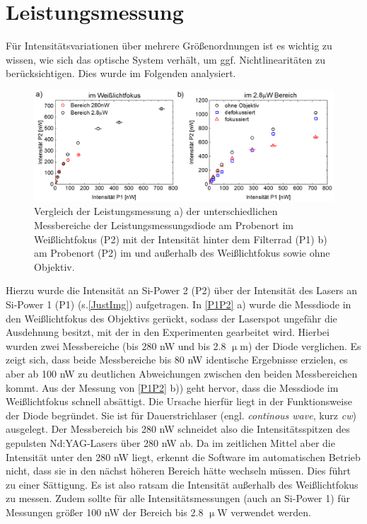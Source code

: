 \section{Leistungsmessung}
\label{Leistmess}
Für Intensitätsvariationen über mehrere Größenordnungen ist es wichtig zu wissen, wie sich das optische System verhält, um ggf. Nichtlinearitäten zu berücksichtigen. Dies wurde im Folgenden analysiert.
\begin{figure}[b]
\centering
\includegraphics[width=1\textwidth]{Bilder/Anhang/Bereichsvergleich}
\caption[Vergleich Leistungsmessung]{Vergleich der Leistungsmessung a) der unterschiedlichen Messbereiche der Leistungsmessungsdiode am Probenort im Weißlichtfokus (P2) mit der Intensität hinter dem Filterrad (P1) b) am Probenort (P2) im und außerhalb des Weißlichtfokus sowie ohne Objektiv.}
\label{P1P2}
\end{figure}
Hierzu wurde die Intensität an Si-Power 2 (P2) über der Intensität des Lasers an Si-Power 1 (P1) (s.\autoref{JustImg}) aufgetragen. In \autoref{P1P2} a) wurde die Messdiode in den Weißlichtfokus des Objektivs gerückt, sodass der Laserspot ungefähr die Ausdehnung besitzt, mit der in den Experimenten gearbeitet wird. Hierbei wurden zwei Messbereiche (bis 280 nW und bis 2.8 $\upmu$m) der Diode verglichen. Es zeigt sich, dass beide Messbereiche bis 80 nW identische Ergebnisse erzielen, es aber ab 100 nW zu deutlichen Abweichungen zwischen den beiden Messbereichen kommt. Aus der Messung von \autoref{P1P2} b)) geht hervor, dass die Messdiode im Weißlichtfokus schnell absättigt. Die Ursache hierfür liegt in der Funktionsweise der Diode begründet. Sie ist für Dauerstrichlaser (engl. \textit{continous wave}, kurz \textit{cw}) ausgelegt. Der Messbereich bis 280 nW schneidet also die Intensitätsspitzen des gepulsten Nd:YAG-Lasers über 280 nW ab. Da im zeitlichen Mittel aber die Intensität unter den 280 nW liegt, erkennt die Software im automatischen Betrieb nicht, dass sie in den nächst höheren Bereich hätte wechseln müssen. Dies führt zu einer Sättigung. Es ist also ratsam die Intensität außerhalb des Weißlichtfokus zu messen. Zudem sollte für alle Intensitätsmessungen (auch an Si-Power 1) für Messungen größer 100 nW der Bereich bis 2.8 $\upmu$W verwendet werden. 
